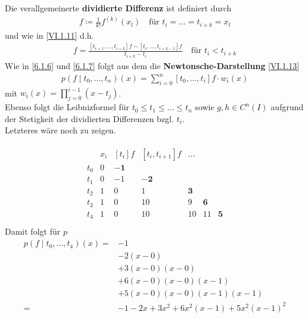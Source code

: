 \begin{Defe}
  Die verallgemeinerte \textbf{dividierte Differenz}
  ist definiert durch 
  \begin{gather*}
    [t_i,\dots, t_{i+k}]f \coloneqq \frac{1}{k!} f^{(k)}(x_l)
    \quad \text{für } t_i=\dots = t_{i+k}=x_l 
  \end{gather*}
  und wie in \eqref{VI.1.11} d.h.
  \begin{gather*}
    [t_i,\dots, t_{i+k}]f = \frac{[t_{i+1},\dots, t_{i+k}]f
      - [t_i,\dots,t_{i+k-1}]f}
    {t_{i+k}-t_i}
    \quad \text{für } t_i<t_{i+k}
  \end{gather*}
  Wie in \ref{6.1.6} und \ref{6.1.7} folgt aus dem 
  die \textbf{Newtonsche-Darstellung} \eqref{VI.1.13}
  \begin{gather*}
    p(f\mid  t_0,\dots, t_{n})(x) = \sum_{i=0}^{n}[t_0,\dots,t_i]f\cdot w_i(x) 
  \end{gather*}
  mit $w_i(x) =\prod_{j=0}^{i-1}(x-t_j)$.\\
  Ebenso folgt die Leibnizformel für $t_0\leq t_1\leq\dots\leq t_n$
  sowie $g,h\in C^n(I)$ aufgrund der Stetigkeit
  der dividierten Differenzen bzgl. $t_i$.\\
  Letzteres wäre noch zu zeigen.
\end{Defe}


\begin{Bspe}\label{6.1.16}
  \begin{align*}
    \begin{array}{ccccccc}
      &   x_i& [t_i]f & [t_i,t_{i+1}]f &\dots \\
      t_0 &0 & \boldsymbol{-1} \\
      t_1 &0 & -1 & \boldsymbol{-2}\\ 
      t_2 &1 & 0  & 1  &\boldsymbol{3} \\
      t_3 &1 & 0  & 10 &9  &\boldsymbol{6} \\
      t_4 &1 & 0  & 10 &10 &11 & \boldsymbol{5}
    \end{array}\\
  \end{align*}
  Damit folgt für $p$
  \begin{align*}
    p(f\mid t_0,\dots, t_4)(x) 
    =& -1\\
     &-2(x-0)\\
     & +3(x-0)(x-0)\\
     & +6(x-0)(x-0)(x-1)\\
     & +5(x-0)(x-0)(x-1)(x-1)\\
    =&-1-2x+3x^2+6x^2(x-1)+5x^2(x-1)^2
  \end{align*}
\end{Bspe}

